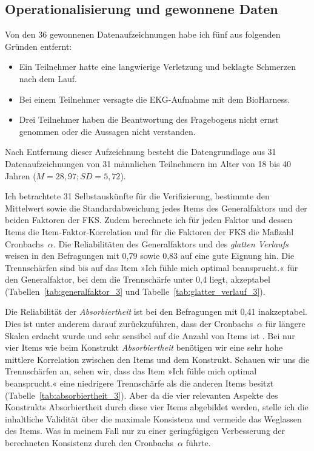 \subsection{Operationalisierung und gewonnene Daten} 

\label{sub:operationalisierung_und_gewonnene_daten_5_3}

Von den 36 gewonnenen Datenaufzeichnungen habe ich fünf aus folgenden Gründen entfernt: 
\begin{itemize}
	
	\item Ein Teilnehmer hatte eine langwierige Verletzung und beklagte Schmerzen nach dem Lauf.
	
	\item Bei einem Teilnehmer versagte die \ac{EKG}-Aufnahme mit dem BioHarness.
	
	\item Drei Teilnehmer haben die Beantwortung des Fragebogens nicht ernst genommen oder die Aussagen nicht verstanden. 
\end{itemize}

Nach Entfernung dieser Aufzeichnung besteht die Datengrundlage aus 31 Datenaufzeichnungen von 31 männlichen Teilnehmern im Alter von 18 bis 40 Jahren ($M = 28{,}97; SD = 5{,}72$).

Ich betrachtete 31 Selbstauskünfte für die Verifizierung, bestimmte den Mittelwert sowie die Standardabweichung jedes Items des Generalfaktors und der beiden Faktoren der \ac{FKS}. Zudem berechnete ich für jeden Faktor und dessen Items die Item-Faktor-Korrelation und für die Faktoren der \ac{FKS} die Maßzahl Cronbachs~$\alpha$. Die Reliabilitäten des Generalfaktors und des \emph{glatten Verlaufs} weisen in den Befragungen mit 0,79 sowie 0,83 auf eine gute Eignung hin. Die Trennschärfen sind bis auf das Item »Ich fühle mich optimal beansprucht.« für den Generalfaktor, bei dem die Trennschärfe unter 0,4 liegt, akzeptabel (Tabellen~\ref{tab:generalfaktor_3} und Tabelle~\ref{tab:glatter_verlauf_3}).

Die Reliabilität der \emph{Absorbiertheit} ist bei den Befragungen mit 0,41 inakzeptabel. Dies ist unter anderem darauf zurückzuführen, dass der Cronbachs~$\alpha$ für längere Skalen erdacht wurde und sehr sensibel auf die Anzahl von Items ist \citep{Cortina1993}. Bei nur vier Items wie beim Konstrukt \emph{Absorbiertheit} benötigen wir eine sehr hohe mittlere Korrelation zwischen den Items und dem Konstrukt. Schauen wir uns die Trennschärfen an, sehen wir, dass das Item »Ich fühle mich optimal beansprucht.« eine niedrigere Trennschärfe als die anderen Items besitzt (Tabelle~\ref{tab:absorbiertheit_3}). Aber da die vier relevanten Aspekte des Konstrukts Absorbiertheit durch diese vier Items abgebildet werden, stelle ich die inhaltliche Validität über die maximale Konsistenz und vermeide das Weglassen des Items. Was in meinem Fall nur zu einer geringfügigen Verbesserung der berechneten Konsistenz durch den Cronbachs~$\alpha$ führte. 

